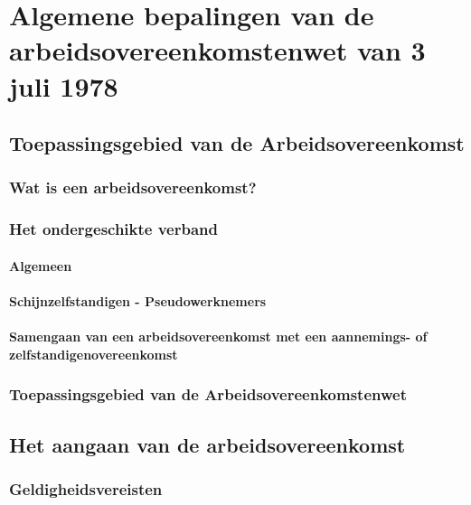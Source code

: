 \chapter{Algemene bepalingen van de arbeidsovereenkomstenwet van          3 juli 1978}
\label{hoofdstuk:1}


\section{Toepassingsgebied van de Arbeidsovereenkomst}

\subsection{Wat is een arbeidsovereenkomst?}

\subsection{Het ondergeschikte verband}

\subsubsection{Algemeen}

\subsubsection{Schijnzelfstandigen - Pseudowerknemers}

\subsubsection{Samengaan van een arbeidsovereenkomst met een aannemings- of zelfstandigenovereenkomst}

\subsection{Toepassingsgebied van de Arbeidsovereenkomstenwet}

\section{Het aangaan van de arbeidsovereenkomst}

\subsection{Geldigheidsvereisten}

